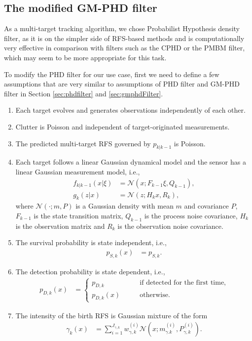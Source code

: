 \subsection{The modified GM-PHD filter}
As a multi-target tracking algorithm, we chose Probabilist Hypothesis density filter, as it is on the simpler side of
RFS-based methods and is computationally very effective in comparison with filters such as the CPHD or the PMBM filter,
which may seem
to be more appropriate for this task.

To modify the PHD filter for our use case, first we need to define a few assumptions that are very similar to
assumptions of PHD filter and GM-PHD filter in Section \ref{sec:phdfilter} and \ref{sec:gmphdFilter}.
\begin{enumerate}
  \item Each target evolves and generates observations independently of each other. \label{as:mphd_1}
  \item Clutter is Poisson and independent of target-originated measurements. \label{as:mphd_2}
  \item The predicted multi-target RFS governed by $p_{k|k-1}$ is Poisson. \label{as:mphd_3}
  \item Each target follows a linear Gaussian dynamical model and the sensor has a linear \label{as:mphd_4}
  Gaussian measurement model, i.e.,
  \begin{align}
    f_{k|k-1}(x|\xi) &= \mathcal{N}(x; F_{k-1}\xi, Q_{k-1}),\\
    g_k(z|x) &= \mathcal{N}(z;H_kx, R_k),
  \end{align}
  where $\mathcal{N}(\cdot;m,P)$ is a Gaussian density with mean $m$ and covariance $P$, $F_{k-1}$ is the state transition matrix, $Q_{k-1}$ is the process noise covariance, $H_k$ is the observation matrix and $R_k$ is the observation noise covariance.
  \item The survival probability is state independent, i.e.,
  \begin{align}
    p_{S,k}(x) &= p_{S,k}.
  \end{align}
    \label{as:mphd_5}
  \item The detection probability is state dependent, i.e.,
    \begin{align}
      p_{D,k}(x) &= 
      \begin{cases}
         p_{D,k} &\qquad \text{if detected for the first time,} \\
         p_{D,k}(x) &\qquad \text{otherwise.}
      \end{cases}
    \end{align}
    \label{as:mphd_6}
  \item The intensity of the birth RFS is Gaussian mixture of the form
  \begin{align}
    \gamma_k(x) &= \sum_{i=1}^{J_{\gamma,k}}w_{\gamma,k}^{(i)} \mathcal{N}(x; m_{\gamma.k}^{(i)}, P_{\gamma,k}^{(i)}).
    \label{eq:mphd_intensity}
  \end{align}
  \label{as:mphd_7}
\end{enumerate}

